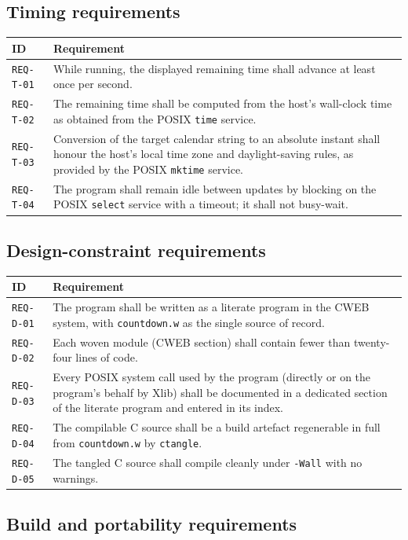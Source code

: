 \documentclass[12pt]{article}
\newcommand{\code}[1]{\texttt{#1}}
\newcommand{\req}[1]{\texttt{#1}}
\newcommand{\rrow}[2]{\req{#1} & #2 \\}
\begin{document}
\subsection{Timing requirements}

\begin{longtable}{p{}p{}}
\toprule
\textbf{ID} & \textbf{Requirement} \\
\midrule
\endhead
\rrow{REQ-T-01}{While running, the displayed remaining time shall advance
  at least once per second.}
\rrow{REQ-T-02}{The remaining time shall be computed from the host's
  wall-clock time as obtained from the POSIX \code{time} service.}
\rrow{REQ-T-03}{Conversion of the target calendar string to an absolute
  instant shall honour the host's local time zone and daylight-saving
  rules, as provided by the POSIX \code{mktime} service.}
\rrow{REQ-T-04}{The program shall remain idle between updates by blocking
  on the POSIX \code{select} service with a timeout; it shall not
  busy-wait.}
\bottomrule
\end{longtable}

\subsection{Design-constraint requirements}

\begin{longtable}{p{}p{}}
\toprule
\textbf{ID} & \textbf{Requirement} \\
\midrule
\endhead
\rrow{REQ-D-01}{The program shall be written as a literate program in the
  CWEB system, with \code{countdown.w} as the single source of record.}
\rrow{REQ-D-02}{Each woven module (CWEB section) shall contain fewer than
  twenty-four lines of code.}
\rrow{REQ-D-03}{Every POSIX system call used by the program (directly or
  on the program's behalf by Xlib) shall be documented in a dedicated
  section of the literate program and entered in its index.}
\rrow{REQ-D-04}{The compilable C source shall be a build artefact
  regenerable in full from \code{countdown.w} by \code{ctangle}.}
\rrow{REQ-D-05}{The tangled C source shall compile cleanly under
  \code{-Wall} with no warnings.}
\bottomrule
\end{longtable}

\subsection{Build and portability requirements}
\end{document}
